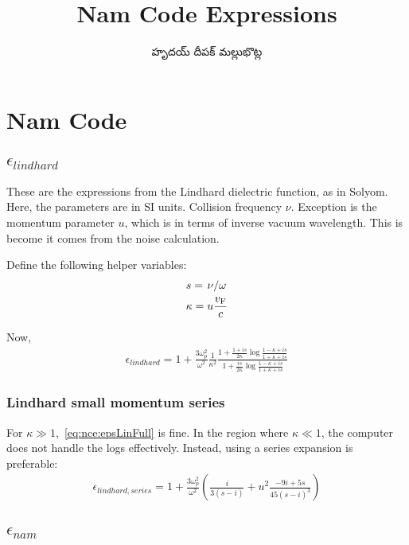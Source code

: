 \documentclass[../main.tex]{subfiles}
\title{Nam Code Expressions}
\author{\begin{telugu}హృదయ్ దీపక్ మల్లుభొట్ల\end{telugu}}
\date{}
\begin{document}
	\onlyinsubfile{\maketitle}
	\onlyinsubfile{\tableofcontents}

	\section{Nam Code} \label{sec:nce}

	\subsection{$\epsilon_{lindhard}$} \label{subsec:nce:epsl}

	These are the expressions from the Lindhard dielectric function, as in Solyom\supercite{SolyomV3}.
	Here, the parameters are in SI units.
	Collision frequency $\nu$.
	Exception is the momentum parameter $u$, which is in terms of inverse vacuum wavelength.
	This is become it comes from the noise calculation.

	Define the following helper variables:
	\begin{gather}
		s = \flatfrac{\nu}{\omega} \\
		\kappa = u \frac{\vf}{c}
	\end{gather}

	Now,
	\begin{gather}
		\epsilon_{lindhard} = 1 + \frac{3 \omega_p^2}{\omega^2} \frac{1}{\kappa^2} \frac{1 +\frac{1 + is}{2 \kappa} \log \frac{1 - \kappa + i s}{1 + \kappa + i s}}{1 + \frac{is}{2 \kappa} \log \frac{1 - \kappa + i s}{1 + \kappa + i s}} \label{eq:nce:epsLinFull}
	\end{gather}

	\subsubsection{Lindhard small momentum series}

	For $\kappa \gg 1$,~\eqref{eq:nce:epsLinFull} is fine.
	In the region where $\kappa \ll 1$, the computer does not handle the logs effectively.
	Instead, using a series expansion is preferable:
	\begin{gather}
		\epsilon_{lindhard, series} = 1 + \frac{3 \omega_p^2}{\omega^2} \left(\frac{i}{3 (s - i)} + u^2  \frac{-9i + 5 s}{45 (s - i)^3} \right)
	\end{gather}

	\subsection{$\epsilon_{nam}$} \label{subsec:nce:epsn}
\end{document}
